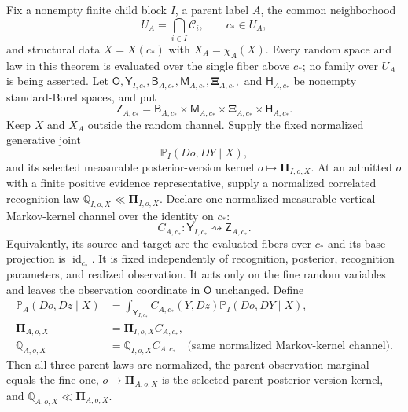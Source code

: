 \medskip
{}
Fix a nonempty finite child block $I$, a parent label $A$, the common neighborhood
\begin{equation}
U_A=\bigcap_{i\in I}\mathcal C_i,
\qquad c_*\in U_A,
\label{eq:rg-pointwise-parent-overlap}
\end{equation}
and structural data $X=X(c_*)$ with $X_A=\chi_A(X)$.  Every random space and
law in this theorem is evaluated over the single fiber above $c_*$; no family
over $U_A$ is being asserted.  Let
$\mathsf O,\mathsf Y_{I,c_*},\mathsf B_{A,c_*},\mathsf M_{A,c_*},
\boldsymbol\Xi_{A,c_*},$ and $\mathsf H_{A,c_*}$ be nonempty standard-Borel
spaces, and put
\begin{equation}
\mathsf Z_{A,c_*}
=\mathsf B_{A,c_*}\times\mathsf M_{A,c_*}
\times\boldsymbol\Xi_{A,c_*}\times\mathsf H_{A,c_*}.
\label{eq:rg-pointwise-parent-space}
\end{equation}
Keep $X$ and $X_A$ outside the random channel. Supply the fixed normalized generative joint
\[
\mathbb P_I(Do,DY\mid X),
\]
and its selected measurable posterior-version kernel $o\mapsto\boldsymbol\Pi_{I,o,X}$.
At an admitted $o$ with a finite positive evidence representative, supply a normalized correlated recognition law
$\mathbb Q_{I,o,X}\ll\boldsymbol\Pi_{I,o,X}$. Declare one normalized measurable
vertical Markov-kernel channel over the identity on $c_*$:
\begin{equation}
C_{A,c_*}:\mathsf Y_{I,c_*}\rightsquigarrow\mathsf Z_{A,c_*}.
\label{eq:rg-pointwise-parent-channel}
\end{equation}
Equivalently, its source and target are the evaluated fibers over $c_*$ and its
base projection is $\operatorname{id}_{c_*}$.  It is fixed independently of
recognition, posterior, recognition parameters, and realized observation. It
acts only on the fine random variables and leaves the observation coordinate
in $\mathsf O$ unchanged. Define
\begin{align}
\mathbb P_A(Do,Dz\mid X)
&=\int_{\mathsf Y_{I,c_*}}C_{A,c_*}(Y,Dz)\mathbb P_I(Do,DY\mid X),
\label{eq:rg-pointwise-parent-generative}\\
\boldsymbol\Pi_{A,o,X}&=\boldsymbol\Pi_{I,o,X}C_{A,c_*},\\
\mathbb Q_{A,o,X}&=\mathbb Q_{I,o,X}C_{A,c_*}
\quad\text{(same normalized Markov-kernel channel).}
\label{eq:rg-pointwise-parent-triple}
\end{align}
Then all three parent laws are normalized, the parent observation marginal equals the fine one,
$o\mapsto\boldsymbol\Pi_{A,o,X}$ is the selected parent posterior-version kernel, and
$\mathbb Q_{A,o,X}\ll\boldsymbol\Pi_{A,o,X}$.

